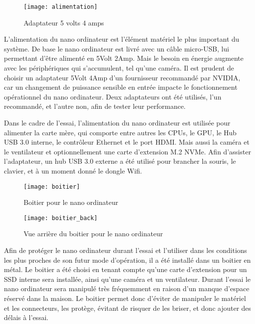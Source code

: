 \begin{figure}[H]
    \centering
    \texttt{[image: alimentation]}
    \caption{Adaptateur 5 volts 4 amps}
    \label{fig:alimenation}
\end{figure}
\par L'alimentation du nano ordinateur est l'élément matériel le plus important du système. De base le nano ordinateur est livré avec un câble micro-USB, lui permettant d'être alimenté en 5Volt 2Amp. Mais le besoin en énergie augmente avec les périphériques qui s'accumulent, tel qu'une caméra. Il est prudent de choisir un adaptateur 5Volt 4Amp d'un fournisseur recommandé par NVIDIA, car un changement de puissance sensible en entrée impacte le fonctionnement opérationnel du nano ordinateur. Deux adaptateurs ont été utilisés, l'un recommandé, et l'autre non, afin de tester leur performance. 
\par Dans le cadre de l'essai, l'alimentation du nano ordinateur est utilisée pour alimenter la carte mère, qui comporte entre autres les CPUs, le GPU, le Hub USB 3.0 interne, le contrôleur Ethernet et le port HDMI. Mais aussi la caméra et  le ventilateur et optionnellement une carte d'extension M.2 NVMe. Afin d'assister l'adaptateur, un hub USB 3.0 externe a été utilisé pour brancher la souris, le clavier, et à un moment donné le dongle Wifi.
\begin{figure}[H]
    \centering
    \texttt{[image: boitier]}
    \caption{Boitier pour le nano ordinateur}
    \label{fig:boitier}
\end{figure}
\begin{figure}[H]
    \centering
    \texttt{[image: boitier\_back]}
    \caption{Vue arrière du boitier pour le nano ordinateur}
    \label{fig:boitier_arriere}
\end{figure}
\par Afin de protéger le nano ordinateur durant l'essai et l'utiliser dans les conditions les plus proches de son futur mode d'opération, il a été installé dans un boitier en métal. Le boitier a été choisi en tenant compte qu'une carte d'extension pour un SSD interne sera installée, ainsi qu'une caméra et un ventilateur. Durant l'essai le nano ordinateur sera manipulé très fréquemment en raison d'un manque d'espace réservé dans la maison. Le boitier permet donc d'éviter de manipuler le matériel et les connecteurs, les protège, évitant de risquer de les briser, et donc ajouter des délais à l'essai. 
